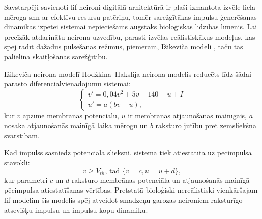 Savstarpēji savienoti \Gls{lif} neironi digitālā arhitektūrā ir plaši izmantota izvēle liela mēroga \Gls{snn} ar efektīvu
resursu patēriņu, tomēr sarežģītākas impulsu ģenerēšanas dinamikas izpētei sistēmai nepieciešams augstāks bioloģiskās
līdzības līmenis. Lai precīzāk atdarinātu neirona uzvedību, parasti izvēlas reālistiskākus modeļus, kas spēj radīt dažādus
pulsēšanas režīmus, piemēram, Ižikeviča modeli \cite{Izhikevich2003}, taču tas palielina skaitļošanas sarežģītību.

Ižikeviča neirona modelī \cite{Izhikevich2003} Hodžkina–Hakslija neirona modelis \cite{hodgkin1952} reducēts līdz šādai
parasto diferenciālvienādojumu sistēmai:
\begin{equation}
\begin{cases}
  \label{eq:izhi}
  v' = 0{,}04v^{2} + 5v + 140 - u + I \\
  u' = a(bv - u),
\end{cases}
\end{equation}
kur \(v\) apzīmē membrānas potenciālu, \(u\) ir membrānas atjaunošanās mainīgais, \(a\) nosaka atjaunošanās mainīgā laika
mērogu un \(b\) raksturo jutību pret zemsliekšņa svārstībām.

Kad impulss sasniedz potenciāla slieksni, sistēma tiek atiestatīta uz pēcimpulsa stāvokli:
\begin{equation}
  \label{eq:postspike}
  v \geq V_{th} \text{, tad } \{v = c, u = u + d\},
\end{equation}
kur parametri \(c\) un \(d\) raksturo membrānas potenciāla un atjaunošanās mainīgā pēcimpulsa atiestatīšanas vērtības.
Pretstatā bioloģiski nereālistiski vienkāršajam \Gls{lif} modelim šis modelis spēj atveidot smadzeņu garozas neironiem raksturīgo atsevišķu
impulsu un impulsu kopu dinamiku.


